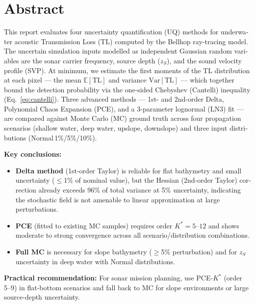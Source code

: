 \documentclass[12pt,a4paper]{article}
\begin{document}
\section*{\textenglish{Abstract}}
\begin{english}
This report evaluates four uncertainty quantification (UQ) methods for underwater
acoustic Transmission Loss (TL) computed by the Bellhop ray-tracing model.
The uncertain simulation inputs modelled as independent Gaussian random variables
are the sonar carrier frequency, source depth ($z_S$), and the sound velocity profile
(SVP).
At minimum, we estimate the first moments of the TL distribution at each pixel ---
the mean $\mathbb{E}[\mathrm{TL}]$ and variance $\mathrm{Var}[\mathrm{TL}]$ ---
which together bound the detection probability via the one-sided Chebyshev
(Cantelli) inequality (Eq.~\ref{eq:cantelli}).
Three advanced methods --- 1st- and 2nd-order Delta, Polynomial Chaos Expansion
(PCE), and a 3-parameter lognormal (LN3) fit --- are compared against Monte Carlo
(MC) ground truth across four propagation scenarios
(shallow water, deep water, upslope, downslope) and three input distributions
(Normal\,1\%/5\%/10\%).

\textbf{Key conclusions:}
\begin{itemize}
  \item \textbf{Delta method} (1st-order Taylor) is reliable for flat bathymetry
        and small uncertainty ($\leq$1\% of nominal value), but the Hessian
        (2nd-order Taylor) correction already exceeds 96\% of total variance
        at 5\% uncertainty, indicating the stochastic field is not amenable to
        linear approximation at large perturbations.
  \item \textbf{PCE} (fitted to existing MC samples) requires order
        $K^*=5$--$12$ and shows moderate to strong convergence across all
        scenario/distribution combinations.
  \item \textbf{Full MC} is necessary for slope bathymetry ($\geq$5\%
        perturbation) and for $z_S$ uncertainty in deep water with Normal
        distributions.
\end{itemize}

\textbf{Practical recommendation:}
For sonar mission planning, use PCE-$K^*$ (order 5--9) in flat-bottom scenarios
and fall back to MC for slope environments or large source-depth uncertainty.
\end{english}
\newpage
{}
\end{document}
